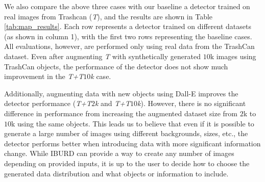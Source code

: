 We also compare the above three cases with our baseline \ie a detector trained on real images from Trashcan (\textit{T}), and the results are shown in Table \ref{tab:map_results}. Each row represents a detector trained on different datasets (as shown in column 1), with the first two rows representing the baseline cases. All evaluations, however, are performed only using real data from the TrashCan dataset.  
Even after augmenting \textit{T} with synthetically generated $10$k images using TrashCan objects, the performance of the detector does not show much improvement in the \textit{T+T$10$k} case. 

Additionally, augmenting data with new objects using Dall-E improves the detector performance (\textit{T+T$2$k} and \textit{T+T$10$k}). However, there is no significant difference in performance from increasing the augmented dataset size from $2$k to $10$k using the same objects.
This leads us to believe that even if it is possible to generate a large number of images using different backgrounds, sizes, etc., the detector performs better when introducing data with more significant information change.
While IBURD can provide a way to create any number of images depending on provided inputs, it is up to the user to decide how to choose the generated data distribution and what objects or information to include.
